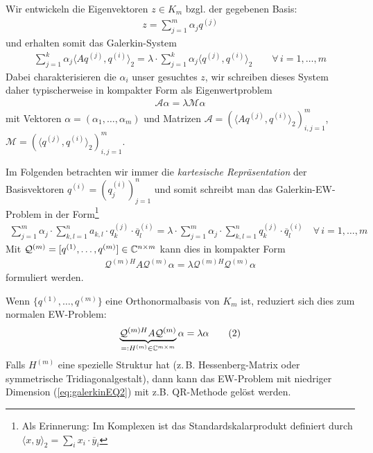 Wir entwickeln die Eigenvektoren $z\in K_m$ bzgl. der gegebenen Basis:
%
\begin{align*}
  z = \sum_{j=1}^{m} \alpha_j q^{(j)}
\end{align*}
%
und erhalten somit das Galerkin-System
%
\begin{align*}
  \sum_{j=1}^{k} \alpha_j \langle Aq^{(j)},q^{(i)}\rangle_2 
  = \lambda\cdot\sum_{j=1}^{k} \alpha_j \langle q^{(j)},q^{(i)}\rangle_2
  \qquad\forall\,i=1,\dots,m
\end{align*}
Dabei charakterisieren die $\alpha_i$ unser gesuchtes $z$, wir schreiben dieses System daher typischerweise 
in kompakter Form als Eigenwertproblem
%
\begin{align*}
  \mathcal{A}\alpha = \lambda\mathcal{M}\alpha
\end{align*} 
%
mit Vektoren $\alpha=(\alpha_1,\dots,\alpha_m)$ und Matrizen
$\mathcal{A}=(\langle Aq^{(j)}, q^{(i)}\rangle_2)_{i,j=1}^m$, 
$\mathcal{M} = (\langle q^{(j)}, q^{(i)}\rangle_2)_{i,j=1}^m$.

Im Folgenden betrachten wir immer die \textit{kartesische Repräsentation} der Basisvektoren $q^{(i)}=(q_j^{(i)})_{j=1}^n$ 
und somit schreibt man das Galerkin-EW-Problem in der Form\footnote{
  Als Erinnerung: Im Komplexen ist das Standardskalarprodukt definiert durch 
  $\langle x,y\rangle_2 = \sum_i x_i\cdot \overline{y}_i$
}
%
\begin{align*}
  \sum_{j=1}^{m} \alpha_j\cdot \sum_{k,l=1}^{n} a_{k,l}\cdot q_k^{(j)}\cdot \overline{q}^{(i)}_l 
  = \lambda\cdot \sum_{j=1}^{m} \alpha_j \cdot\sum_{k,l=1}^{n}q_k^{(j)}\cdot \overline{q}^{(i)}_l
  \quad\forall\, i=1,\dots,m
\end{align*}
%
Mit $\mathcal{Q}^{(m)}=[q^{(1)},\dots,q^{(m)}]\in\mathbb C^{n\times m}$ kann dies in kompakter Form
%
\begin{align*}
  \mathcal{Q}^{(m)H}A\mathcal{Q}^{(m)}\alpha = \lambda \mathcal{Q}^{(m)H}\mathcal{Q}^{(m)}\alpha
\end{align*}
formuliert werden.

Wenn $\{q^{(1)},\dots,q^{(m)}\}$ eine Orthonormalbasis von $K_m$ ist, reduziert sich dies zum normalen EW-Problem:
%
\begin{align*}
  \underbrace{\mathcal{Q}^{(m)H}A\mathcal{Q}^{(m)}}_{=: H^{(m)}\in\mathbb C^{m\times m}}\alpha 
  = \lambda \alpha 
  \tag{2}\label{eq:galerkinEQ2}
\end{align*}
%
Falls $H^{(m)}$ eine spezielle Struktur hat (z.\,B. Hessenberg-Matrix oder symmetrische Tridiagonalgestalt), dann kann 
das EW-Problem mit niedriger Dimension (\ref{eq:galerkinEQ2}) mit z.B. QR-Methode gelöst werden. 

